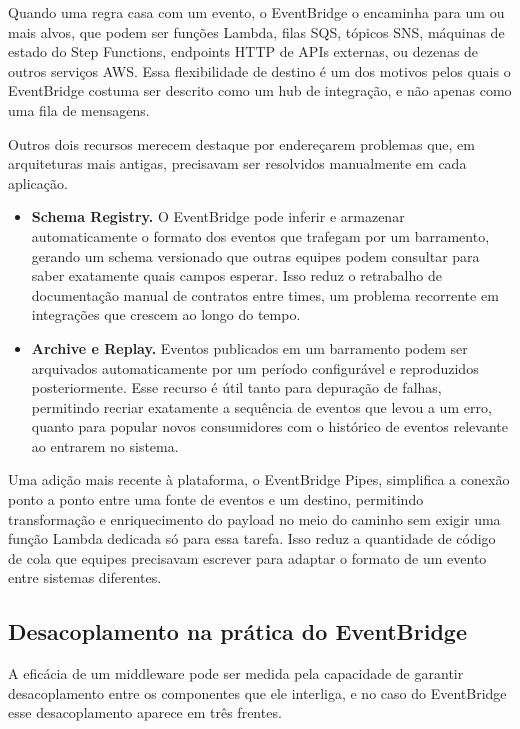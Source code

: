 \documentclass[12pt, a4paper]{article}
\begin{document}
Quando uma regra casa com um evento, o EventBridge o encaminha para um ou mais alvos, que podem ser funções Lambda, filas SQS, tópicos SNS, máquinas de estado do Step Functions, endpoints HTTP de APIs externas, ou dezenas de outros serviços AWS. Essa flexibilidade de destino é um dos motivos pelos quais o EventBridge costuma ser descrito como um hub de integração, e não apenas como uma fila de mensagens.

Outros dois recursos merecem destaque por endereçarem problemas que, em arquiteturas mais antigas, precisavam ser resolvidos manualmente em cada aplicação.

\begin{itemize}
    \item \textbf{Schema Registry.} O EventBridge pode inferir e armazenar automaticamente o formato dos eventos que trafegam por um barramento, gerando um schema versionado que outras equipes podem consultar para saber exatamente quais campos esperar. Isso reduz o retrabalho de documentação manual de contratos entre times, um problema recorrente em integrações que crescem ao longo do tempo.

    \item \textbf{Archive e Replay.} Eventos publicados em um barramento podem ser arquivados automaticamente por um período configurável e reproduzidos posteriormente. Esse recurso é útil tanto para depuração de falhas, permitindo recriar exatamente a sequência de eventos que levou a um erro, quanto para popular novos consumidores com o histórico de eventos relevante ao entrarem no sistema.
\end{itemize}

Uma adição mais recente à plataforma, o EventBridge Pipes, simplifica a conexão ponto a ponto entre uma fonte de eventos e um destino, permitindo transformação e enriquecimento do payload no meio do caminho sem exigir uma função Lambda dedicada só para essa tarefa. Isso reduz a quantidade de código de cola que equipes precisavam escrever para adaptar o formato de um evento entre sistemas diferentes.

\subsection{Desacoplamento na prática do EventBridge}

A eficácia de um middleware pode ser medida pela capacidade de garantir desacoplamento entre os componentes que ele interliga, e no caso do EventBridge esse desacoplamento aparece em três frentes.
\end{document}

